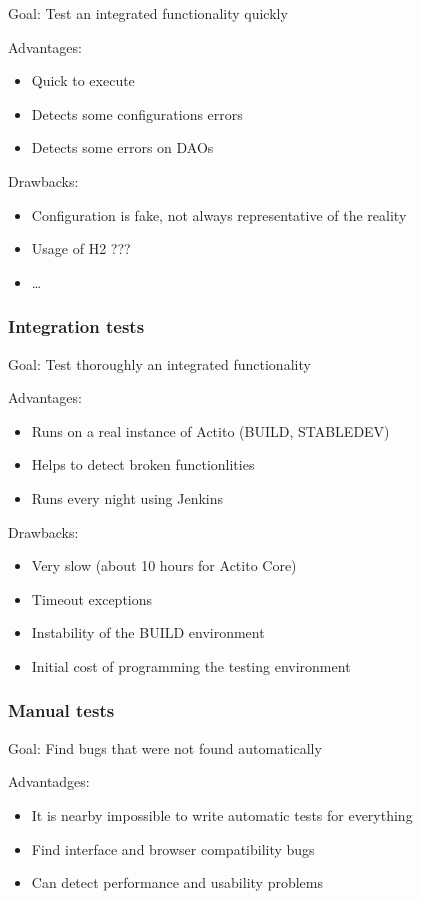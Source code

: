 \documentclass[a4paper, 11pt]{article}
\begin{document}
    Goal: Test an integrated functionality quickly

    Advantages:
    \begin{itemize}
        \item Quick to execute
        \item Detects some configurations errors
        \item Detects some errors on DAOs
    \end{itemize}

    Drawbacks:
    \begin{itemize}
        \item Configuration is fake, not always representative of the reality
        \item Usage of H2 ???
        \item \ldots
    \end{itemize}

    \subsubsection{Integration tests}

    Goal: Test thoroughly an integrated functionality

    Advantages:
    \begin{itemize}
        \item Runs on a real instance of Actito (BUILD, STABLEDEV)
        \item Helps to detect broken functionlities
        \item Runs every night using Jenkins
    \end{itemize}

    Drawbacks:
    \begin{itemize}
        \item Very slow (about 10 hours for Actito Core)
        \item Timeout exceptions
        \item Instability of the BUILD environment
        \item Initial cost of programming the testing environment
    \end{itemize}

    \subsubsection{Manual tests}

    Goal: Find bugs that were not found automatically

    Advantadges:
    \begin{itemize}
        \item It is nearby impossible to write automatic tests for everything
        \item Find interface and browser compatibility bugs
        \item Can detect performance and usability problems
    \end{itemize}
\end{document}
